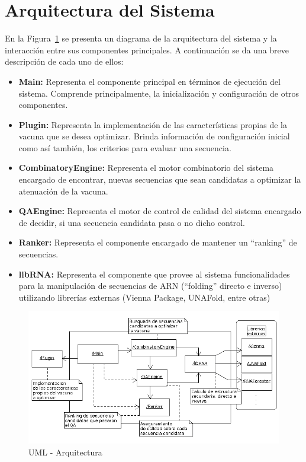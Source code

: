 \documentclass[a4paper,10pt]{article}
\begin{document}
\section{Arquitectura del Sistema}
\label{architecture}

En la Figura~\ref{uml:architecture} se presenta un diagrama de la
arquitectura del sistema y la interacci\'on entre sus componentes principales.
A continuaci\'on se da una breve descripci\'on de cada uno de ellos:

  \begin{itemize}
   \item \textbf{Main:} Representa el componente principal en t\'erminos de
ejecuci\'on del sistema. Comprende principalmente, la inicializaci\'on y
configuraci\'on de otros componentes.

   \item \textbf{Plugin:} Representa la implementaci\'on de las
caracter\'isticas propias de la vacuna que se desea optimizar. Brinda
informaci\'on de configuraci\'on inicial como as\'i tambi\'en, los criterios
para evaluar una secuencia.

   \item \textbf{CombinatoryEngine:} Representa el motor combinatorio del
sistema encargado de encontrar, nuevas secuencias que sean candidatas a
optimizar la atenuaci\'on de la vacuna.

   \item \textbf{QAEngine:} Representa el motor de control de calidad del
sistema encargado de decidir, si una secuencia candidata pasa o no dicho
control.

   \item \textbf{Ranker:} Representa el componente encargado de mantener un
``ranking'' de secuencias.

   \item \textbf{libRNA:} Representa el componente que provee al sistema
funcionalidades para la manipulaci\'on de secuencias de ARN (``folding'' directo
e inverso) utilizando librer\'ias externas (Vienna Package, UNAFold, entre
otras)

  \end{itemize}

  \begin{figure}
  \centering
  \includegraphics[scale=0.5]{architecture.png}  
  \caption{UML - Arquitectura}
  \label{uml:architecture}
  \end{figure}
\end{document}
